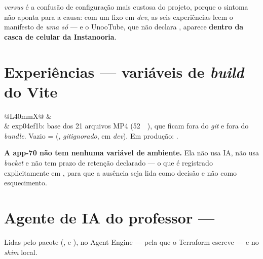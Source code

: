 \begin{atencao}
 \emph{versus}  é a confusão de
configuração mais custosa do projeto, porque o sintoma não aponta para a causa:
com um  fixo em \emph{dev}, as seis experiências leem o
manifesto de \emph{uma só} --- e o UnooTube, que não declara ,
aparece \textbf{dentro da casca de celular da Instanooria}.
\end{atencao}

\section{Experiências --- variáveis de \emph{build} do Vite}

\begin{tabularx}{\linewidth}{@{}L{40mm}X@{}}
\toprule
\headrow {} & \\
\midrule
{} & exp04ef1b: base dos 21 arquivos MP4
  (\SI{52}{\mega\byte}), que ficam fora do \emph{git} e fora do \emph{bundle}.
  Vazio =  (, \emph{gitignorado}, em
  \emph{dev}). Em produção:
  .\\
\bottomrule
\end{tabularx}

\begin{nota}
\textbf{A app-70 não tem nenhuma variável de ambiente.} Ela não usa IA, não usa
\emph{bucket} e não tem prazo de retenção declarado --- o que é registrado
explicitamente em , para que a ausência seja lida como decisão e
não como esquecimento.
\end{nota}

\section{Agente de IA do professor --- }

Lidas pelo pacote (,  e
), no Agent Engine --- pela  que o Terraform escreve --- e no
\emph{shim} local.

